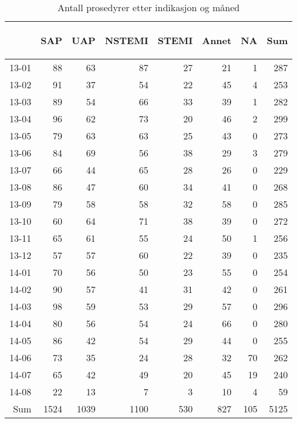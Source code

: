 \documentclass[presentation,xcolor=pdftex,dvipsnames,table]{beamer}
\begin{document}
\begin{frame}
\begin{tiny}
\begin{table}[ht]
\centering
\begin{tabular}{rrrrrrrr}
  \toprule
 & \begin{sideways} SAP \end{sideways} & \begin{sideways} UAP \end{sideways} & \begin{sideways} NSTEMI \end{sideways} & \begin{sideways} STEMI \end{sideways} & \begin{sideways} Annet \end{sideways} & \begin{sideways} NA \end{sideways} & \begin{sideways} Sum \end{sideways} \\ 
  \midrule
13-01 & 88 & 63 & 87 & 27 & 21 & 1 & 287 \\ 
  13-02 & 91 & 37 & 54 & 22 & 45 & 4 & 253 \\ 
  13-03 & 89 & 54 & 66 & 33 & 39 & 1 & 282 \\ 
  13-04 & 96 & 62 & 73 & 20 & 46 & 2 & 299 \\ 
  13-05 & 79 & 63 & 63 & 25 & 43 & 0 & 273 \\ 
  13-06 & 84 & 69 & 56 & 38 & 29 & 3 & 279 \\ 
  13-07 & 66 & 44 & 65 & 28 & 26 & 0 & 229 \\ 
  13-08 & 86 & 47 & 60 & 34 & 41 & 0 & 268 \\ 
  13-09 & 79 & 58 & 58 & 32 & 58 & 0 & 285 \\ 
  13-10 & 60 & 64 & 71 & 38 & 39 & 0 & 272 \\ 
  13-11 & 65 & 61 & 55 & 24 & 50 & 1 & 256 \\ 
  13-12 & 57 & 57 & 60 & 22 & 39 & 0 & 235 \\ 
  14-01 & 70 & 56 & 50 & 23 & 55 & 0 & 254 \\ 
  14-02 & 90 & 57 & 41 & 31 & 42 & 0 & 261 \\ 
  14-03 & 98 & 59 & 53 & 29 & 57 & 0 & 296 \\ 
  14-04 & 80 & 56 & 54 & 24 & 66 & 0 & 280 \\ 
  14-05 & 86 & 42 & 54 & 29 & 44 & 0 & 255 \\ 
  14-06 & 73 & 35 & 24 & 28 & 32 & 70 & 262 \\ 
  14-07 & 65 & 42 & 49 & 20 & 45 & 19 & 240 \\ 
  14-08 & 22 & 13 & 7 & 3 & 10 & 4 & 59 \\ 
  Sum & 1524 & 1039 & 1100 & 530 & 827 & 105 & 5125 \\ 
   \bottomrule
\end{tabular}
\caption{Antall prosedyrer etter indikasjon og måned} 
\end{table}\end{tiny}
\end{frame}
\end{document}
